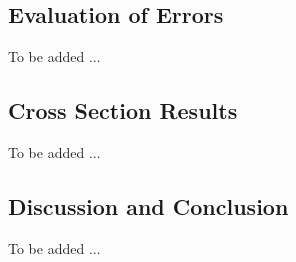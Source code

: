 \subsection{Evaluation of Errors}

To be added ...

\subsection{Cross Section Results}

To be added ...

\subsection{Discussion and Conclusion}

To be added ...



